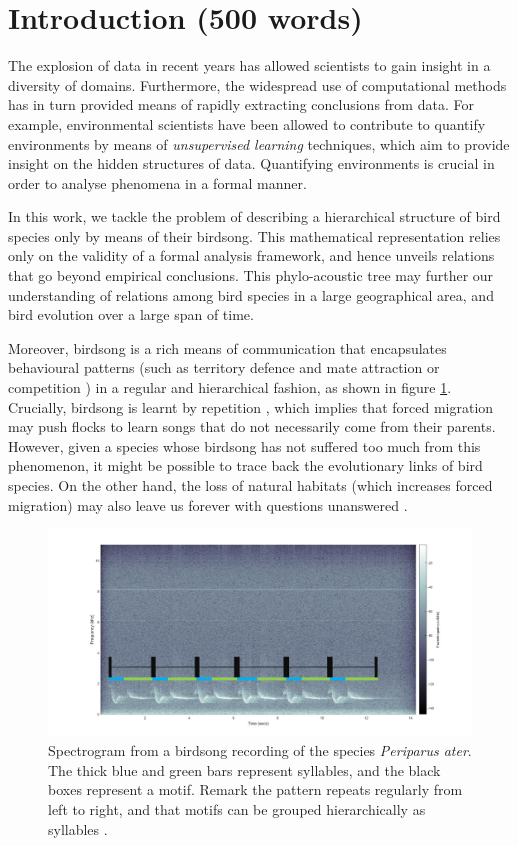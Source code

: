 \documentclass[pdftex,11pt,a4paper]{article}
\theoremstyle{definition}
\theoremstyle{remark}
\begin{document}
\section{Introduction (500 words)}
The explosion of data in recent years has allowed scientists to gain insight in a diversity of domains. Furthermore, the widespread use of computational methods has in turn provided means of rapidly extracting conclusions from data. For example, environmental scientists have been allowed to contribute to quantify environments by means of \emph{unsupervised learning} techniques, which aim to provide insight on the hidden structures of data. Quantifying environments is crucial in order to analyse phenomena in a formal manner.
\par In this work, we tackle the problem of describing a hierarchical structure of bird species only by means of their birdsong. This mathematical representation relies only on the validity of a formal analysis framework, and hence unveils relations that go beyond empirical conclusions. This phylo-acoustic tree may further our understanding of relations among bird species in a large geographical area, and bird evolution over a large span of time. 
\par Moreover, birdsong is a rich means of communication that encapsulates behavioural patterns (such as territory defence and mate attraction or competition \cite{Berwick2013, Naguib2014}) in a regular and hierarchical fashion, as shown in figure \ref{fig_birdsong_structure}. Crucially, birdsong is learnt by repetition \cite{Berwick2013}, which implies that forced migration may push flocks to learn songs that do not necessarily come from their parents. However, given a species whose birdsong has not suffered too much from this phenomenon, it might be possible to trace back the evolutionary links of bird species. On the other hand, the loss of natural habitats (which increases forced migration) may also leave us forever with questions unanswered \cite{Marler2004}.
\begin{figure}[t]
\centering
\includegraphics[width=\textwidth]{images/birdsong_structure}
\caption{Spectrogram from a birdsong recording of the species \emph{Periparus ater}. The thick blue and green bars represent syllables, and the black boxes represent a motif. Remark the pattern repeats regularly from left to right, and that motifs can be grouped hierarchically as syllables \cite{Snowdon2013}.}
\label{fig_birdsong_structure}
\end{figure}
\end{document}

